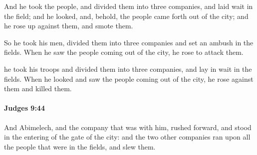 			\begin{versebox}
					\item[BHS] 
					\item[ASV] And he took the people, and divided them into three companies, and laid wait in the field; and he looked, and, behold, the people came forth out of the city; and he rose up against them, and smote them.
					\item[NIV] So he took his men, divided them into three companies and set an ambush in the fields. When he saw the people coming out of the city, he rose to attack them.
					\item[NRSV] he took his troops and divided them into three companies, and lay in wait in the fields. When he looked and saw the people coming out of the city, he rose against them and killed them.
			\end{versebox}

		\paragraph{Judges 9:44} %
			\label{JUDGES-9-44}

			And Abimelech, and the company that was with him, rushed forward, and stood in the entering of the gate of the city: and the two other companies ran upon all the people that were in the fields, and slew them.

